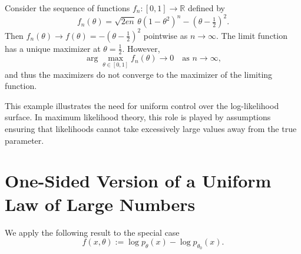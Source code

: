 \begin{ex}
Consider the sequence of functions $f_n:[0,1]\to\mathbb{R}$ defined by
\begin{equation*}
f_n(\theta)
=
\sqrt{2 e n}\,\theta(1-\theta^2)^n
-
\left(\theta - \tfrac{1}{2}\right)^2.
\end{equation*}
Then $f_n(\theta) \to f(\theta) = -(\theta - \tfrac{1}{2})^2$ pointwise as $n \to \infty$. The limit function has a unique maximizer at $\theta = \tfrac{1}{2}$.
However,
\begin{equation*}
\arg\max_{\theta \in [0,1]} f_n(\theta) \longrightarrow 0
\quad \text{as } n \to \infty,
\end{equation*}
and thus the maximizers do not converge to the maximizer of the limiting function.
\end{ex}

\begin{remark}
This example illustrates the need for uniform control over the log-likelihood surface. In maximum likelihood theory, this role is played by assumptions ensuring that likelihoods cannot take excessively large values away from the true parameter.
\end{remark}

\section{One-Sided Version of a Uniform Law of Large Numbers}

We apply the following result to the special case
\begin{equation*}
f(x,\theta) := \log p_{\theta}(x) - \log p_{\theta_0}(x).
\end{equation*}

